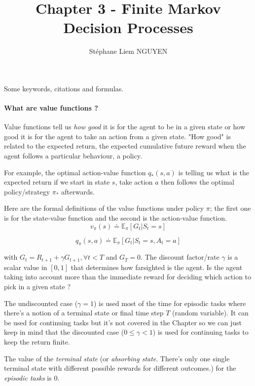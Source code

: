 \documentclass[10pt,a4paper]{article}
\title{Chapter 3 - Finite Markov Decision Processes}
\author{Stéphane Liem NGUYEN}
\begin{document}
\maketitle

Some keywords, citations and formulas.

\paragraph{What are value functions ?}
Value functions tell us \textit{how good} it is for the agent to be in a given state or how good it is for the agent to take an action from a given state. "How good" is related to the expected return, the expected cumulative future reward when the agent follows a particular behaviour, a policy.

For example, the optimal action-value function $q_*(s, a)$ is telling us what is the expected return if we start in state $s$, take action $a$ then follows the optimal policy/strategy $\pi_*$ afterwards.

Here are the formal definitions of the value functions under policy $\pi$; the first one is for the state-value function and the second is the action-value function.
\begin{equation}
v_\pi(s) \doteq \mathbb{E}_\pi[G_t \lvert S_t = s]
\end{equation}

\begin{equation}
q_\pi(s, a) \doteq \mathbb{E}_\pi[G_t \lvert S_t = s, A_t = a]
\end{equation}

with $G_t = R_{t+1} + \gamma G_{t+1}, \forall t < T$ and $G_T = 0$. The discount factor/rate $\gamma$ is a scalar value in $[0, 1]$ that determines how farsighted is the agent. Is the agent taking into account more than the immediate reward for deciding which action to pick in a given state ?

The undiscounted case ($\gamma=1$) is used most of the time for episodic tasks where there's a notion of a terminal state or final time step $T$ (random variable). It can be used for continuing tasks but it's not covered in the Chapter so we can just keep in mind that the discounted case ($0 \leq \gamma < 1$) is used for continuing tasks to keep the return finite.

The value of the \textit{terminal state} (or \textit{absorbing state}. There's only one single terminal state with different possible rewards for different outcomes.) for the \textit{episodic tasks} is $0$.
\end{document}
